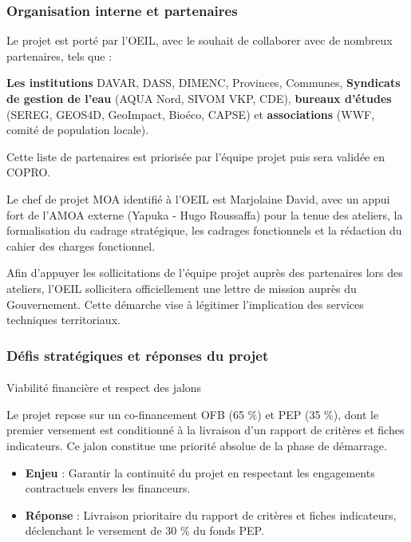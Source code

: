 \documentclass[
  11pt,
]{article}
\makeatletter
\let\oldparagraph\paragraph
\renewcommand{\paragraph}{
    \@ifstar
      \xxxParagraphStar
      \xxxParagraphNoStar
  }
\newcommand{\xxxParagraphStar}[1]{\oldparagraph*{#1}\mbox{}}
\newcommand{\xxxParagraphNoStar}[1]{\oldparagraph{#1}\mbox{}}
\providecommand{\tightlist}{%
  \setlength{\itemsep}{0pt}\setlength{\parskip}{0pt}}\usepackage{longtable,booktabs,array}
\makeatother
\begin{document}
\subsubsection{Organisation interne et
partenaires}\label{organisation-interne-et-partenaires}

Le projet est porté par l'OEIL, avec le souhait de collaborer avec de
nombreux partenaires, tels que :

\textbf{Les institutions} DAVAR, DASS, DIMENC, Provinces, Communes,
\textbf{Syndicats de gestion de l'eau} (AQUA Nord, SIVOM VKP, CDE),
\textbf{bureaux d'études} (SEREG, GEOS4D, GeoImpact, Bioéco, CAPSE) et
\textbf{associations} (WWF, comité de population locale).

Cette liste de partenaires est priorisée par l'équipe projet puis sera
validée en COPRO.

Le chef de projet MOA identifié à l'OEIL est Marjolaine David, avec un
appui fort de l'AMOA externe (Yapuka - Hugo Roussaffa) pour la tenue des
ateliers, la formalisation du cadrage stratégique, les cadrages
fonctionnels et la rédaction du cahier des charges fonctionnel.

Afin d'appuyer les sollicitations de l'équipe projet auprès des
partenaires lors des ateliers, l'OEIL sollicitera officiellement une
lettre de mission auprès du Gouvernement. Cette démarche vise à
légitimer l'implication des services techniques territoriaux.

\subsubsection{Défis stratégiques et réponses du
projet}\label{duxe9fis-stratuxe9giques-et-ruxe9ponses-du-projet}

\paragraph{Viabilité financière et respect des
jalons}\label{viabilituxe9-financiuxe8re-et-respect-des-jalons}

Le projet repose sur un co-financement OFB (65 \%) et PEP (35 \%), dont
le premier versement est conditionné à la livraison d'un rapport de
critères et fiches indicateurs. Ce jalon constitue une priorité absolue
de la phase de démarrage.

\begin{itemize}
\tightlist
\item
  \textbf{Enjeu} : Garantir la continuité du projet en respectant les
  engagements contractuels envers les financeurs.
\item
  \textbf{Réponse} : Livraison prioritaire du rapport de critères et
  fiches indicateurs, déclenchant le versement de 30 \% du fonds PEP.
\end{itemize}
\end{document}
